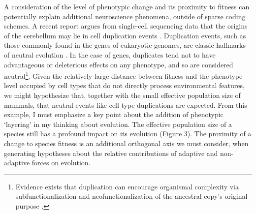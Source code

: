 \documentclass{article}
\begin{document}
A consideration of the level of phenotypic change and its proximity to fitness can potentially explain additional neuroscience phenomena, outside of sparse coding schemes. A recent report argues from single-cell sequencing data that the origins of the cerebellum may lie in cell duplication events \cite{kebschull_luo_2020}. Duplication events, such as those commonly found in the genes of eukaryotic genomes, are classic hallmarks of neutral evolution \cite{Stoltzfus_1999, Lynch_2007, lynch2007origins, wideman_doolittle_2019}. In the case of genes, duplicates tend not to have advantageous or deleterious effects on any phenotype, and so are considered neutral\footnote{Evidence exists that duplication can encourage organismal complexity via subfunctionalization and neofunctionalization of the ancestral copy's original purpose \cite{dean_thornton_2007, Lynch_2007}.}. Given the relatively large distance between fitness and the phenotype level occupied by cell types that do not directly process environmental features, we might hypothesize that, together with the small effective population size of mammals, that neutral events like cell type duplications are expected. From this example, I must emphasize a key point about the addition of phenotypic `layering' in my thinking about evolution. The effective population size of a species still has a profound impact on its evolution (Figure 3). The proximity of a change to species fitness is an additional orthogonal axis we must consider, when generating hypotheses about the relative contributions of adaptive and non-adaptive forces on evolution. 
\end{document}
